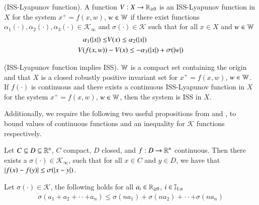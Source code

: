 \documentclass[preprint,5p, twocolumn, authoryear]{elsarticle}
\begin{document}
\begin{definition} \label{def:iss_lyapunov_func}
(ISS-Lyapunov function). A function $V : X \rightarrow \mathbb{R}_{\geq 0}$
is an ISS-Lyapunov function in $X$ for the system $x^+ = f(x, w)$, $w \in \mathbb{W}$
if there exist functions $\alpha_1(\cdot), \alpha_2(\cdot), \alpha_3(\cdot) 
\in \mathcal{K}_{\infty}$ and $\sigma(\cdot) \in \mathcal{K}$
such that for all $x \in X$ and $w \in \mathbb{W}$
\begin{align*}
    \alpha_1(\left| x \right|) \leq & V(x) \leq \alpha_2(\left| x \right|) \\
    V(f(x, w)) &- V(x) \leq -\alpha_3(\left| x \right|) + \sigma(\left| w \right|)
\end{align*}
\end{definition}

\begin{prop} \label{prop:lyapunov_implies_iss}
(ISS-Lyapunov function implies ISS). $\mathbb{W}$ is a compact
set containing the origin and that $X$ is a closed robustly
positive invariant set for $x^+ = f(x, w)$, $w \in \mathbb{W}$. If 
$f(\cdot)$ is continuous and there exists a continuous 
ISS-Lyapunov function in $X$ for the system $x^+ = f(x, w)$, $w \in \mathbb{W}$, 
then the system is ISS in $X$.
\end{prop}

Additionally, we require the following two 
useful propositions from 
\cite*{allan:bates:risbeck:rawlings:2017} and 
\cite*{rawlings:ji:2012},
to bound values of continuous functions and an
inequality for $\mathcal{K}$ functions respectively.

\begin{prop} \label{prop:continuous_funcs}
    Let $C \subseteq D \subseteq \mathbb{R}^n$, $C$ compact, 
    $D$ closed, and $f : D \rightarrow \mathbb{R}^n$ continuous.  
    Then there exists a $\sigma(\cdot) \in \mathcal{K}_{\infty}$,
    such that for all $x \in C$ and $y \in D$, we have that 
    $\left| f(x) - f(y) \right| \leq \sigma(\left| x-y \right|)$.
\end{prop}
    
\begin{prop} \label{prop:Kfunction_inequality}
    Let $\sigma(\cdot) \in \mathcal{K}$, the following holds 
    for all $a_i \in \mathbb{R}_{\geq 0}$, $i \in \mathbb{I}_{1:n}$ 
    \begin{align*}
        \sigma(a_1 + a_2 + \cdot \cdot + a_n) \leq \sigma(na_1) + 
        \sigma(na_2) + \cdot \cdot + \sigma(na_n)
    \end{align*}    
\end{prop}
\end{document}
